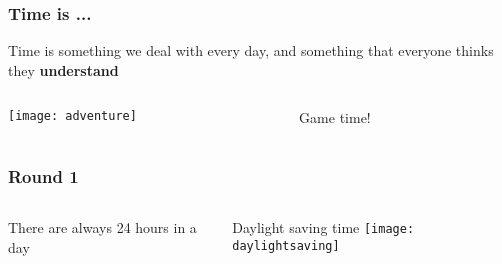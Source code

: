 \documentclass[aspectratio=169, 15pt,usenames,dvipsnames]{beamer}
\begin{document}
	\begin{gdblank}
		\frametitle{Time is ...}
		\LARGE\centering Time is something we deal with every day, and something that everyone thinks they 
		\bf understand
	\end{gdblank} 
	\begin{gdblank}
		\begin{columns}
			\begin{column}{0.5\textwidth}
				\centering\texttt{[image: adventure]} 
			\end{column}
			\begin{column}{0.5\textwidth}
				\Huge\centering Game time! 
			\end{column}
		\end{columns}     		
	\end{gdblank} 
	\begin{gdblank}
		\frametitle{Round 1}    
		\begin{columns}
			\begin{column}{0.70\textwidth}
				\centering
				\LARGE There are always 24 hours in a day 
				\pause     
			\end{column}
			\begin{column}{0.3\textwidth}
				\large\centering Daylight saving time 
				\vskip0.5cm
				\texttt{[image: daylightsaving]}
			\end{column}
		\end{columns}
	\end{gdblank} 
	
\end{document}
